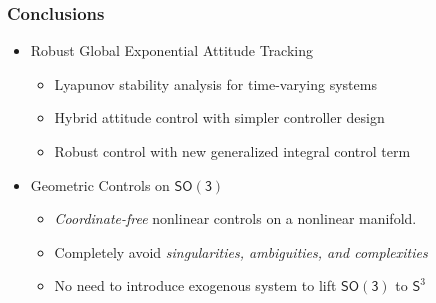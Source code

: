 \documentclass[11pt,professionalfonts,hyperref={pdftex,pdfpagemode=none,pdfstartview=FitH}]{beamer}
\newcommand{\SO}{\ensuremath{\mathsf{SO(3)}}}
\newcommand{\Sph}{\ensuremath{\mathsf{S}}}
\begin{document}
\begin{frame}
\frametitle{Conclusions}
\begin{itemize}
    \item Robust Global Exponential Attitude Tracking
    \begin{itemize}
        \item Lyapunov stability analysis for time-varying systems
        \item Hybrid attitude control with simpler controller design
        \item Robust control with new generalized integral control term
    \end{itemize}
\vspace*{0.4cm}\pause
    \item Geometric Controls on $\SO$
    \begin{itemize}
        \item \textit{Coordinate-free} nonlinear controls on a nonlinear manifold.
        \item Completely avoid \textit{singularities, ambiguities, and complexities}
        \item No need to introduce exogenous system to lift $\SO$ to $\Sph^3$
    \end{itemize}
\end{itemize}
\end{frame}
\end{document}
